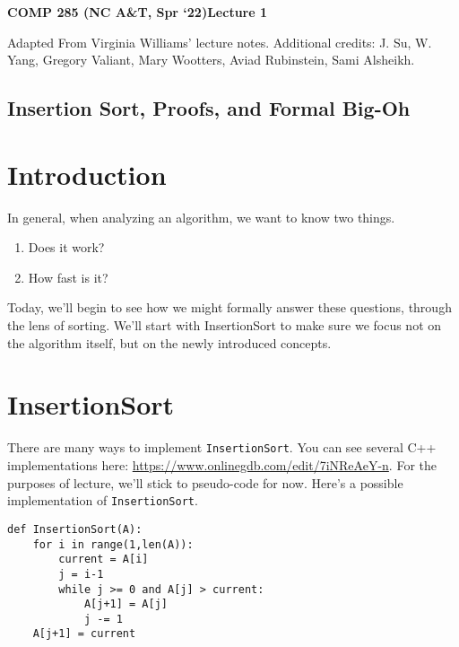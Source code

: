 \documentclass [12pt]{article}
\begin{document}
 

{\LARGE \textbf {COMP 285 (NC A\&T, Spr `22)}\hfill \textbf {Lecture 1} } 
\vspace {1em} 
\begin {Instruction} 

Adapted From Virginia Williams’ lecture notes. Additional credits: J. Su, W. Yang, Gregory Valiant, Mary Wootters, Aviad Rubinstein, Sami Alsheikh.
\end {Instruction} 

\begin{centering}
\section*{Insertion Sort, Proofs, and Formal Big-Oh}
\end{centering}


\section{Introduction}

In general, when analyzing an algorithm, we want to know two things.

\begin{enumerate}
    \item Does it work?
    \item How fast is it?
\end{enumerate}

Today, we’ll begin to see how we might formally answer these questions, through the lens
of sorting. We’ll start with InsertionSort to make sure we focus not on the algorithm itself, but on the newly introduced concepts.

\section{InsertionSort}

There are many ways to implement \texttt{InsertionSort}. You can see several C++ implementations here: \href{https://www.onlinegdb.com/edit/7iNReAeY-n}{https://www.onlinegdb.com/edit/7iNReAeY-n}. For the purposes of lecture, we'll stick to pseudo-code for now. Here's a possible implementation of \texttt{InsertionSort}.

\begin{verbatim}
def InsertionSort(A):
    for i in range(1,len(A)):
        current = A[i]
        j = i-1
        while j >= 0 and A[j] > current:
            A[j+1] = A[j]
            j -= 1
    A[j+1] = current
\end{verbatim}
\end{document}
